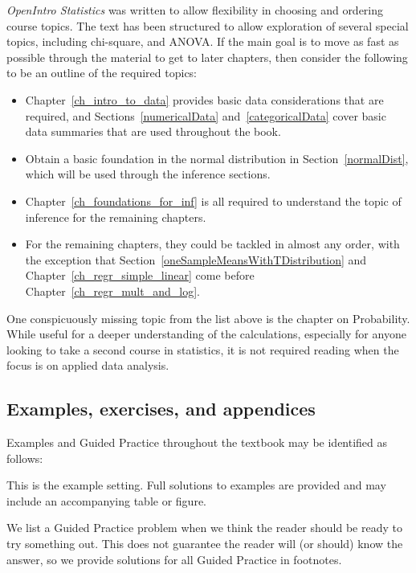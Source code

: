 \noindent%
\emph{OpenIntro Statistics} was written to allow flexibility
in choosing and ordering course topics.
The text has been structured to allow exploration of
several special topics, including chi-square, and ANOVA.
If the main goal is to move as fast as possible through
the material to get to later chapters, then consider the
following to be an outline of the required topics:
\begin{itemize}
\item Chapter~\ref{ch_intro_to_data} provides basic data
    considerations that are required, and
    Sections~\ref{numericalData}
    and~\ref{categoricalData}
    cover basic data summaries that are used throughout the book.
\item Obtain a basic foundation in the normal distribution
    in Section~\ref{normalDist}, which will be used through
    the inference sections.
\item Chapter~\ref{ch_foundations_for_inf} is all required
    to understand the topic of inference for the remaining
    chapters.
\item For the remaining chapters, they could be tackled in
    almost any order, with the exception that
    Section~\ref{oneSampleMeansWithTDistribution}
    and Chapter~\ref{ch_regr_simple_linear}
    come before Chapter~\ref{ch_regr_mult_and_log}.
\end{itemize}
One conspicuously missing topic from the list above is the
chapter on Probability.
While useful for a deeper understanding of the calculations,
especially for anyone looking to take a second course in
statistics, it is not required reading when the focus is on
applied data analysis.


\subsection*{Examples, exercises, and appendices}

Examples and Guided Practice throughout the textbook may be
identified as follows:

\begin{examplewrap}
\begin{nexample}{This is the example setting.}
  Full solutions to examples are provided and may include
  an accompanying table or figure.
\end{nexample}
\end{examplewrap}

\begin{exercisewrap}
\begin{nexercise}
We list a Guided Practice problem when we think the reader
should be ready to try something out.
This does not guarantee the reader will (or should)
know the answer, so we provide solutions for all Guided
Practice in footnotes.\footnotemark
\end{nexercise}
\end{exercisewrap}

